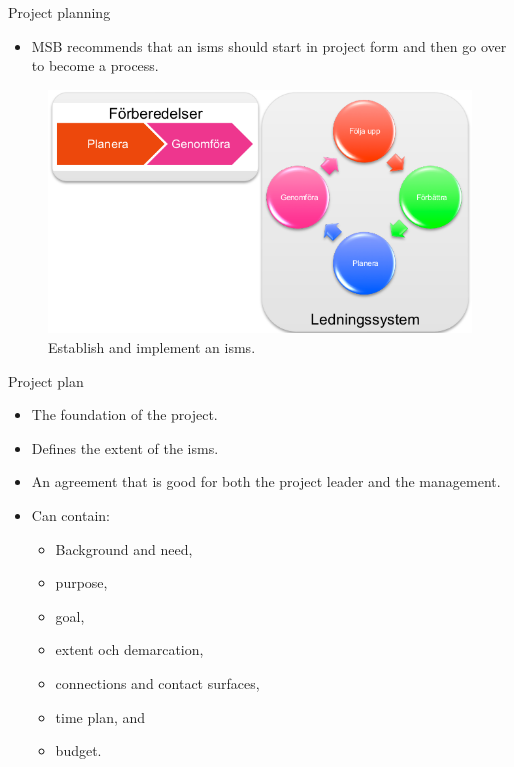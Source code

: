 \documentclass{beamer}
\begin{document}
\begin{frame}{Project planning}
  \begin{itemize}
    \item MSB recommends that an \ac{isms} should start in project form and
      then go over to become a process.
  \end{itemize}
  \begin{figure}
    \includegraphics[height=0.5\textheight]{lis.png}
    \caption{Establish and implement an \ac{isms}.}
  \end{figure}
\end{frame}

\begin{frame}{Project plan}
  \begin{itemize}
    \item The foundation of the project.
    \item Defines the extent of the \ac{isms}\@.
    \item An agreement that is good for both the project leader and the
      management.
    \item Can contain:
      \begin{itemize}
        \item Background and need,
        \item purpose,
        \item goal,
        \item extent och demarcation,
        \item connections and contact surfaces,
        \item time plan, and
        \item budget.
      \end{itemize}
  \end{itemize}
\end{frame}
\end{document}
